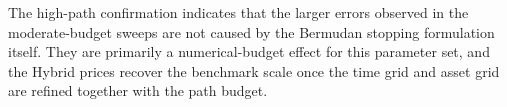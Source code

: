 \documentclass[pdflatex,sn-mathphys-num]{sn-jnl}
\begin{document}


The high-path confirmation indicates that the larger errors observed in the moderate-budget sweeps are not caused by the Bermudan stopping formulation itself. They are primarily a numerical-budget effect for this parameter set, and the Hybrid prices recover the benchmark scale once the time grid and asset grid are refined together with the path budget.

\clearpage
\appendix

\end{document}
